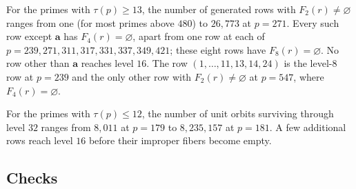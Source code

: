 \documentclass[11pt]{article}
\theoremstyle{definition}
\theoremstyle{remark}
\newcommand{\vct}[1]{\mathbf{#1}}
\begin{document}
For the primes with $\tau(p)\geq13$, the number of generated rows with
$F_2(r)\neq\varnothing$ ranges from one (for most primes above $480$) to
$26{,}773$ at $p=271$.  Every such row except $\vct{a}$ has
$F_4(r)=\varnothing$, apart from one row at each of
$p=239,271,311,317,331,337,349,421$; these eight rows have
$F_8(r)=\varnothing$.  No row other than $\vct{a}$ reaches level $16$.
The row $(1,\ldots,11,13,14,24)$ is the level-$8$ row at $p=239$ and the
only other row with $F_2(r)\neq\varnothing$ at $p=547$, where
$F_4(r)=\varnothing$.

For the primes with $\tau(p)\leq12$, the number of unit orbits surviving
through level $32$ ranges from $8{,}011$ at $p=179$ to $8{,}235{,}157$ at
$p=181$.  A few additional rows reach level $16$ before their improper
fibers become empty.

\subsection{Checks}
\end{document}
